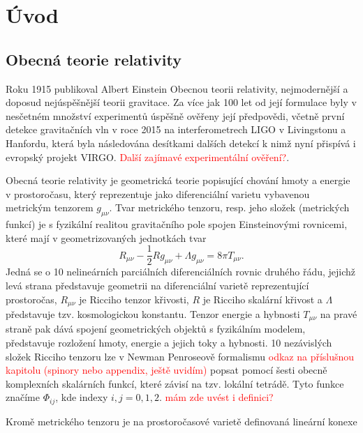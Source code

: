 \chapter*{Úvod}

\section*{Obecná teorie relativity}

Roku 1915 publikoval Albert Einstein Obecnou teorii relativity, nejmodernější a doposud nejúspěšnější teorii gravitace. Za více jak 100 let od její formulace byly v nesčetném množství
experimentů úspěšně ověřeny její předpovědi, včetně první detekce gravitačních vln v roce 2015 na interferometrech LIGO v Livingstonu a Hanfordu, která byla následována
desítkami dalších detekcí k nimž nyní přispívá i evropský projekt VIRGO. \textcolor{red}{Další zajímavé experimentální ověření?}.



Obecná teorie relativity je geometrická teorie popisující chování hmoty a energie v prostoročasu, který reprezentuje jako diferenciální varietu vybavenou metrickým tenzorem $g_{\mu \nu}$.
Tvar metrického tenzoru, resp. jeho složek (metrických funkcí) je s fyzikální realitou gravitačního pole spojen Einsteinovými rovnicemi, které mají v geometrizovaných jednotkách
tvar
\begin{equation}
    \label{eq:einsten_field_equations}
    R_{\mu \nu} - \frac{1}{2} R g_{\mu \nu} + \Lambda g_{\mu \nu} = 8 \pi T_{\mu \nu}.
\end{equation}
Jedná se o 10 nelineárních parciálních diferenciálních rovnic druhého řádu, jejichž levá strana představuje geometrii na diferenciální varietě reprezentující prostoročas, $R_{\mu \nu}$ je Ricciho tenzor křivosti, $R$ je Ricciho skalární křivost a $\Lambda$
představuje tzv. kosmologickou konstantu. Tenzor energie a hybnosti $T_{\mu \nu}$ na pravé straně pak dává spojení geometrických objektů s fyzikálním modelem, představuje rozložení hmoty,
energie a jejich toky a hybnosti.
10 nezávislých složek Ricciho tenzoru lze v Newman Penroseově formalismu \textcolor{red}{odkaz na příslušnou kapitolu (spinory nebo appendix, ještě uvidím)} popsat pomocí šesti obecně komplexních skalárních funkcí, které
závisí na tzv. lokální tetrádě. Tyto funkce značíme $\Phi_{ij}$, kde indexy $i, j=0,1,2$. \textcolor{red}{mám zde uvést i definici?}

Kromě metrického tenzoru je na prostoročasové varietě definovaná lineární konexe